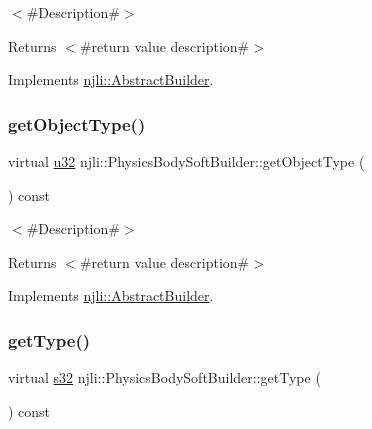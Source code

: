 $<$\#\+Description\#$>$

\begin{DoxyReturn}{Returns}
$<$\#return value description\#$>$ 
\end{DoxyReturn}


Implements \mbox{\hyperlink{classnjli_1_1_abstract_builder_a902f73ea78031b06aca183a417f3413b}{njli\+::\+Abstract\+Builder}}.

\mbox{\label{classnjli_1_1_physics_body_soft_builder_a40ced68212472cadc5e7a23450a665e4}} 
\subsubsection{\texorpdfstring{get\+Object\+Type()}{getObjectType()}}
{\footnotesize\ttfamily virtual \mbox{\hyperlink{_util_8h_a10e94b422ef0c20dcdec20d31a1f5049}{u32}} njli\+::\+Physics\+Body\+Soft\+Builder\+::get\+Object\+Type (\begin{DoxyParamCaption}{ }\end{DoxyParamCaption}) const\hspace{0.3cm}{\ttfamily [virtual]}}

$<$\#\+Description\#$>$

\begin{DoxyReturn}{Returns}
$<$\#return value description\#$>$ 
\end{DoxyReturn}


Implements \mbox{\hyperlink{classnjli_1_1_abstract_builder_a0f2d344fcf697b167f4f2b1122b5fb33}{njli\+::\+Abstract\+Builder}}.

\mbox{\label{classnjli_1_1_physics_body_soft_builder_afccd0cd50e60619b3d47016ed21537f8}} 
\subsubsection{\texorpdfstring{get\+Type()}{getType()}}
{\footnotesize\ttfamily virtual \mbox{\hyperlink{_util_8h_aa62c75d314a0d1f37f79c4b73b2292e2}{s32}} njli\+::\+Physics\+Body\+Soft\+Builder\+::get\+Type (\begin{DoxyParamCaption}{ }\end{DoxyParamCaption}) const\hspace{0.3cm}{\ttfamily [virtual]}}

